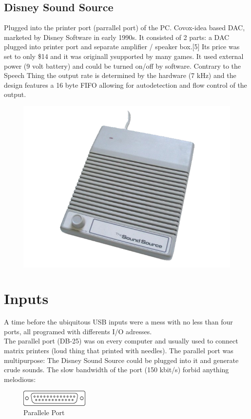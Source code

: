 \documentclass[book.tex]{subfiles}
\begin{document}
  \subsection{Disney Sound Source}
  Plugged into the printer port (parrallel port) of the PC. Covox-idea based DAC, marketed by Disney Software in early 1990s. It consisted of 2 parts: a DAC plugged into printer port and separate amplifier / speaker box.[5] Its price was set to only \$14 and it was originall ysupported by many games. It used external power (9 volt battery) and could be turned on/off by software. Contrary to the Speech Thing the output rate is determined by the hardware (7 kHz) and the design features a 16 byte FIFO allowing for autodetection and flow control of the output.\\
  \par
  \begin{figure}[H] \centering \includegraphics[width=\textwidth]{imgs/hardware/ss.png} \end{figure}








\section{Inputs}
A time before the ubiquitous USB inputs were a mess with no less than four ports, all programed with differents I/O adresses.\\

The parallel port (DB-25) was on every computer and usually used to connect matrix printers (loud thing that printed with needles). The parallel port was multipurpose: The Disney Sound Source could be plugged into it and generate crude sounds. The slow bandwidth of the port (150 kbit/s) forbid anything melodious:
 \begin{figure}[H]
\centering
\includegraphics[width=0.3\textwidth]{imgs/ports/DB-25_parallel_port.eps}
%
\caption{Parallele Port}
\label{fig:parallelPort}
\end{figure}
\end{document}
